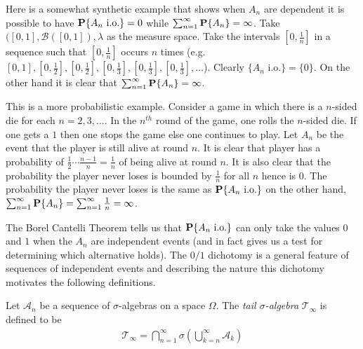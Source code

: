 \begin{examp}Here is a somewhat synthetic example that shows when
  $A_n$ are dependent it is possible to have $\textbf{P}\{A_n \text{
      i.o.}\} = 0$ while $\sum_{n=1}^\infty \textbf{P}\{A_n\} =
  \infty$.  Take $([0,1], \mathcal{B}([0,1]), \lambda$ as the measure
  space.  Take the intervals $[0, \frac{1}{n}]$ in a sequence such
  that $[0, \frac{1}{n}]$ occurs $n$ times (e.g. $[0,1],
  [0,\frac{1}{2}], [0,\frac{1}{2}], [0,\frac{1}{3}],[0,\frac{1}{3}],
  [0,\frac{1}{3}], \dots$). Clearly $\lbrace A_n \text{ i.o.} \rbrace
  = \lbrace 0 \rbrace$.  On the other hand it is clear that
  $\sum_{n=1}^\infty \textbf{P}\{A_n\} = \infty$.
\end{examp}

\begin{examp}This is a more probabilistic example.  Consider a game in
  which there is a $n$-sided die for each $n=2, 3, \dots$.  In the
  $n^{th}$ round of the game, one rolls the $n$-sided die.  If one
  gets a $1$ then one stops the game else one continues to play.  Let
  $A_n$ be the event that the player is still alive at round $n$.  It
  is clear that player has a probability of $\frac{1}{2} \cdots
  \frac{n-1}{n} = \frac{1}{n}$ of being alive at round $n$.  It is also clear that
  the probability the player never loses is bounded by $\frac{1}{n}$
  for all $n$ hence is 0.  The probability the player never loses is
  the same as $\textbf{P}\{A_n \text{ i.o.}\}$ on the other hand,
  $\sum_{n=1}^\infty \textbf{P}\{A_n\} = \sum_{n=1}^\infty \frac{1}{n}
  = \infty$.
\end{examp}

The Borel Cantelli Theorem tells us
that $\textbf{P}\{A_n \text{ i.o.}\}$ can only take the values $0$ and
$1$ when the $A_n$ are independent events (and in fact gives us a test
for determining which alternative holds).  The $0/1$ dichotomy is a
general feature of sequences of independent events and describing the
nature this dichotomy motivates the following definitions.

\begin{defn}Let $\mathcal{A}_n$ be a sequence of $\sigma$-algebras on
  a space $\Omega$.  The \emph{tail $\sigma$-algebra} $\mathcal{T}_\infty$ is
  defined to be 
\begin{align*}
\mathcal{T}_\infty = \bigcap_{n=1}^\infty \sigma\left(\bigcup_{k=n}^\infty \mathcal{A}_k\right)
\end{align*}
\end{defn}

